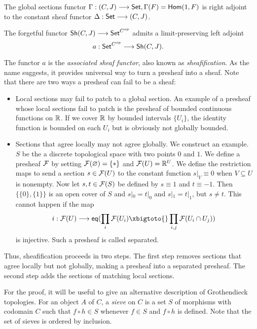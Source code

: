 \begin{theorem}
	The global sections functor $\Gamma: \mathcal{(}C,J) \longrightarrow \mathsf{Set}, \Gamma(F) = \mathsf{Hom}(1,F)$ is right adjoint to the constant sheaf functor $\Delta: \mathsf{Set} \longrightarrow \mathcal{(}C,J)$.
\end{theorem}

\begin{theorem}
	The forgetful functor $\mathsf{Sh}(C,J) \longrightarrow \mathsf{Set}^{C^{op}}$ admits a limit-preserving left adjoint
	\[a : \mathsf{Set}^{C^{op}} \longrightarrow \mathsf{Sh}(C,J).\]
\end{theorem}

The functor $a$ is the \textit{associated sheaf functor}, also known as \textit{sheafification}. As the name suggests, it provides universal way to turn a presheaf into a sheaf.
Note that there are two ways a presheaf can fail to be a sheaf: 
\begin{itemize}
	\item 
		Local sections may fail to patch to a global section. An example of a presheaf whose local sections fail to patch is the presheaf of bounded continuous functions on $\mathbb{R}$. If we cover $\mathbb{R}$ by bounded intervals $\{U_i\}$, the identity function is bounded on each $U_i$ but is obviously not globally bounded. 
	\item 
		Sections that agree locally may not agree globally. We construct an example. $S$ be the a discrete topological space with two points $0$ and $1$. We define a presheaf $\mathcal{F}$ by setting $\mathcal{F}(\varnothing) = \{*\}$ and $\mathcal{F}(U) = \mathbb{R}^U$. We define the restriction maps to send a section $s \in \mathcal{F}(U)$ to the constant function $s|_V \equiv 0$ when $V \subseteq U$ is nonempty. Now let $s,t \in \mathcal{F}(S)$ be defined by $s \equiv 1$ and $t \equiv -1$. Then $\{\{0\}, \{1\}\}$ is an open cover of $S$ and $s|_{0} = t|_{0}$ and $s|_{1} = t|_{1}$, but $s \neq t$.
		This cannot happen if the map
		\[
			i: \Sh{F}(U) \to \mathsf{eq}(\prod_{i} \Sh{F}(U_i) \xbigtoto{} \prod_{i,j} \Sh{F}(U_i \cap U_j))
		\]
		is injective. Such a presheaf is called separated.
\end{itemize} 

Thus, sheafification proceeds in two steps. The first step removes sections that agree locally but not globally, making a presheaf into a separated presheaf.  The second step adds the sections of matching local sections. 

For the proof, it will be useful to give an alternative description of Grothendieck topologies.  For an object $A$ of $C$, a \textit{sieve} on $C$ is a set $S$ of morphisms with codomain $C$ such that $f \circ h \in S$ whenever $f \in S$ and $f \circ h$ is defined. Note that the set of sieves is ordered by inclusion.

